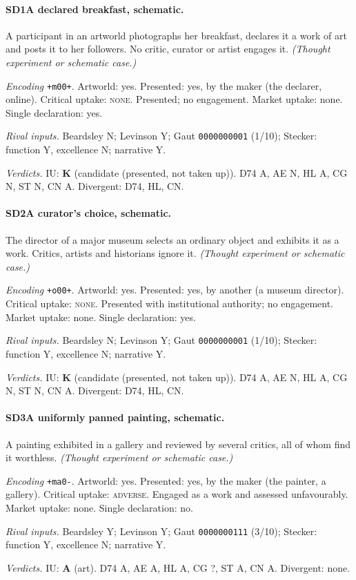 \paragraph{SD1\enspace A declared breakfast, schematic.}
A participant in an artworld photographs her breakfast, declares it a work of art and posts it to her followers. No critic, curator or artist engages it. \textit{(Thought experiment or schematic case.)}\par
\noindent\textit{Encoding} \texttt{+m00+}. Artworld: yes. Presented: yes, by the maker (the declarer, online). Critical uptake: \textsc{none}. Presented; no engagement. Market uptake: none. Single declaration: yes.\par
\noindent\textit{Rival inputs.} Beardsley N; Levinson Y; Gaut \texttt{0000000001} (1/10); Stecker: function Y, excellence N; narrative Y.\par
\noindent\textit{Verdicts.} IU: \textbf{K} (candidate (presented, not taken up)). D74 A, AE N, HL A, CG N, ST N, CN A. Divergent: D74, HL, CN.\par

\paragraph{SD2\enspace A curator's choice, schematic.}
The director of a major museum selects an ordinary object and exhibits it as a work. Critics, artists and historians ignore it. \textit{(Thought experiment or schematic case.)}\par
\noindent\textit{Encoding} \texttt{+o00+}. Artworld: yes. Presented: yes, by another (a museum director). Critical uptake: \textsc{none}. Presented with institutional authority; no engagement. Market uptake: none. Single declaration: yes.\par
\noindent\textit{Rival inputs.} Beardsley N; Levinson Y; Gaut \texttt{0000000001} (1/10); Stecker: function Y, excellence N; narrative Y.\par
\noindent\textit{Verdicts.} IU: \textbf{K} (candidate (presented, not taken up)). D74 A, AE N, HL A, CG N, ST N, CN A. Divergent: D74, HL, CN.\par

\paragraph{SD3\enspace A uniformly panned painting, schematic.}
A painting exhibited in a gallery and reviewed by several critics, all of whom find it worthless. \textit{(Thought experiment or schematic case.)}\par
\noindent\textit{Encoding} \texttt{+ma0-}. Artworld: yes. Presented: yes, by the maker (the painter, a gallery). Critical uptake: \textsc{adverse}. Engaged as a work and assessed unfavourably. Market uptake: none. Single declaration: no.\par
\noindent\textit{Rival inputs.} Beardsley Y; Levinson Y; Gaut \texttt{0000000111} (3/10); Stecker: function Y, excellence N; narrative Y.\par
\noindent\textit{Verdicts.} IU: \textbf{A} (art). D74 A, AE A, HL A, CG ?, ST A, CN A. Divergent: none.\par

